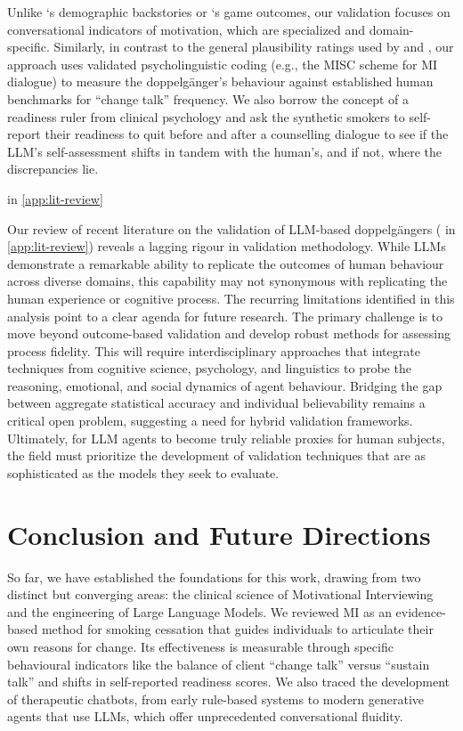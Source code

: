 Unlike \citet{argyle2023}`s demographic backstories or \citet{aher2023}`s game outcomes, our validation focuses on conversational indicators of motivation, which are specialized and domain-specific. Similarly, in contrast to the general plausibility ratings used by \citet{Cook2025} and \citet{Haider2025}, our approach uses validated psycholinguistic coding (e.g., the MISC scheme for MI dialogue) to measure the doppelgänger's behaviour against established human benchmarks for ``change talk'' frequency. We also borrow the concept of a readiness ruler from clinical psychology and ask the synthetic smokers to self-report their readiness to quit before and after a counselling dialogue to see if the LLM's self-assessment shifts in tandem with the human's, and if not, where the discrepancies lie.




 in \cref{app:lit-review} 

Our review of recent literature on the validation of LLM-based doppelgängers ( in \cref{app:lit-review}) reveals a lagging rigour in validation methodology. While LLMs demonstrate a remarkable ability to replicate the outcomes of human behaviour across diverse domains, this capability may not synonymous with replicating the human experience or cognitive process. The recurring limitations identified in this analysis point to a clear agenda for future research. The primary challenge is to move beyond outcome-based validation and develop robust methods for assessing process fidelity. This will require interdisciplinary approaches that integrate techniques from cognitive science, psychology, and linguistics to probe the reasoning, emotional, and social dynamics of agent behaviour. Bridging the gap between aggregate statistical accuracy and individual believability remains a critical open problem, suggesting a need for hybrid validation frameworks. Ultimately, for LLM agents to become truly reliable proxies for human subjects, the field must prioritize the development of validation techniques that are as sophisticated as the models they seek to evaluate.


\section*{Conclusion and Future Directions}

So far, we have established the foundations for this work, drawing from two distinct but converging areas: the clinical science of Motivational Interviewing and the engineering of Large Language Models. We reviewed MI as an evidence-based method for smoking cessation that guides individuals to articulate their own reasons for change. Its effectiveness is measurable through specific behavioural indicators like the balance of client ``change talk'' versus ``sustain talk'' and shifts in self-reported readiness scores. We also traced the development of therapeutic chatbots, from early rule-based systems to modern generative agents that use LLMs, which offer unprecedented conversational fluidity.


